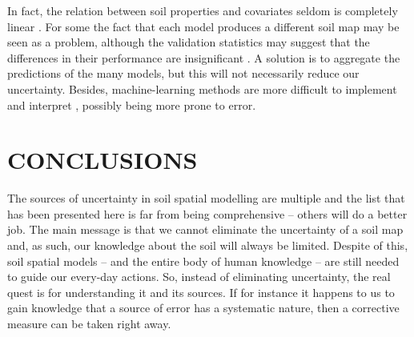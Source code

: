 In fact, the relation between soil properties and covariates seldom is completely linear 
\cite{McKenzieEtAl1999}. For some the fact that each model produces a
different soil map may be seen as a problem, although the validation statistics may suggest that the 
differences in their performance are insignificant \cite{HeungEtAl2016}. A solution is to aggregate 
the predictions of the many models, but this will not necessarily reduce our uncertainty. Besides, 
machine-learning methods are more difficult to implement and interpret \cite{Grunwald2009}, possibly 
being more prone to error.

\section{CONCLUSIONS}

The sources of uncertainty in soil spatial modelling are multiple and the list that has been presented here
is far from being comprehensive -- others will do a better job. The main message is that we cannot 
eliminate the uncertainty of a soil map and, as such, our knowledge about the soil will always
be limited. Despite of this, soil spatial models -- and the entire body of human knowledge -- are still
needed to guide our every-day actions. So, instead of eliminating uncertainty, the real quest is for
understanding it and its sources. If for instance it happens to us to gain knowledge that a source of 
error has a systematic nature, then a corrective measure can be taken right away.


